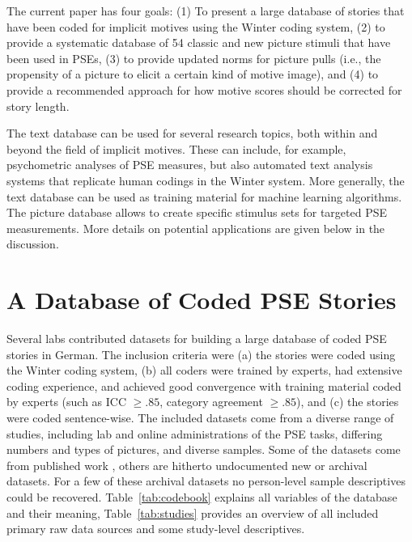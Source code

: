 \documentclass[man,a4paper,mask]{apa6}\usepackage[]{graphicx}\usepackage[]{color}
\begin{document}
The current paper has four goals: (1) To present a large database of stories that have been coded for implicit motives using the Winter coding system, (2) to provide a systematic database of 54 classic and new picture stimuli that have been used in PSEs, (3) to provide updated norms for picture pulls (i.e., the propensity of a picture to elicit a certain kind of motive image), and (4) to provide a recommended approach for how motive scores should be corrected for story length.

The text database can be used for several research topics, both within and beyond the field of implicit motives. These can include, for example, psychometric analyses of PSE measures, but also automated text analysis systems that replicate human codings in the Winter system. More generally, the text database can be used as training material for machine learning algorithms. The picture database allows to create specific stimulus sets for targeted PSE measurements. More details on potential applications are given below in the discussion.


\section{A Database of Coded PSE Stories}

Several labs contributed datasets for building a large database of coded PSE stories in German. The inclusion criteria were (a) the stories were coded using the Winter coding system, (b) all coders were trained by experts, had extensive coding experience, and achieved good convergence with training material coded by experts (such as ICC $\geq .85$, category agreement $\geq .85$), and (c) the stories were coded sentence-wise.
The included datasets come from a diverse range of studies, including lab and online administrations of the PSE tasks, differing numbers and types of pictures, and diverse samples. Some of the datasets come from published work \parencite{kollner_SocialBiopsychologyImplicit_2018,kollner_InfluenceImplicitMotives_2015,janson_InhibitedPowerMotivation_2018a,janson_ImplicitPowerMotive_2017,zygar_EinflussEmotionalerIntelligenz_2013,czikmantori_ExperienceIntrinsicMotivation_2018}, others are hitherto undocumented new or archival datasets. For a few of these archival datasets no person-level sample descriptives could be recovered. Table~\ref{tab:codebook} explains all variables of the database and their meaning, Table~\ref{tab:studies} provides an overview of all included primary raw data sources and some study-level descriptives.
\end{document}
